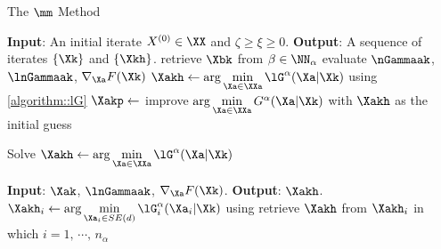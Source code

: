 \begin{algorithm}[t]
	\caption{The $\mm$ Method}
	\label{algorithm::mm}
	\begin{algorithmic}[1]
		\State\textbf{Input}: An initial iterate $X^{(0)}\in \XX$ and $\zeta \geq \xi \geq 0$.
		\State\textbf{Output}: A sequence of iterates $\{\Xk\}$ and $\{\Xkh\}$.\vspace{0.2em} 
		\vspace{0.1em}
		\vspace{0.1em}
		\vspace{0.1em}
		\State  retrieve $\Xbk$ from $\beta\in\NN_{\alpha}$ \label{line::alg1::comm}
		\vspace{0.1em}
		\State evaluate $\nGammaak$, $\lnGammaak$, $\nabla_{\Xa} F(\Xk)$  \label{line::grad_F}
		\vspace{0.1em}
		\State $\Xakh\gets \arg\min\limits_{\Xa\in\XXa }\lG^\alpha(\Xa|\Xk)$ using \cref{algorithm::lG}\label{line::xlG}
		\vspace{0.1em}
		\State $\Xakp\gets$ improve $\arg\min\limits_{\Xa\in\XXa }G^\alpha(\Xa|\Xk)$\label{line::mm_opt} with $\Xakh$ as the initial guess \label{line::xG}
		\EndFor
		\EndFor
	\end{algorithmic}
\end{algorithm}


\begin{algorithm}[t]
	\caption{Solve $\Xakh\gets \arg\min\limits_{\Xa\in \XXa}\lG^\alpha(\Xa|\Xk)$}
	\label{algorithm::lG}
	\begin{algorithmic}[1]
		\State\textbf{Input}: $\Xak$, $\lnGammaak$, $\nabla_{\Xa} F(\Xk)$.
		\vspace{0.1em}
		\State\textbf{Output}: $\Xakh$.\vspace{0.2em} 
		\label{line::xlG1}
		\vspace{0.1em}
		\State $\Xakh_i \gets \arg\min\limits_{\Xa_i\in SE(d)} \lG_i^\alpha(\Xa_i|\Xk)$ using \label{line::alg2::xak}
		\vspace{0.1em}
		\EndFor
		\vspace{0.1em}
		\State retrieve $\Xakh$ from $\Xakh_i$ in which $i = 1,\,\cdots,\,n_\alpha$\label{line::xlG2}
	\end{algorithmic}
\end{algorithm}

